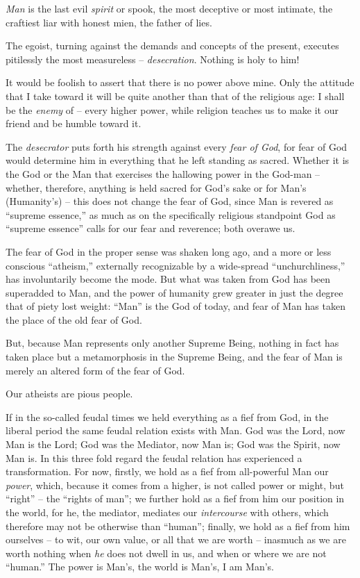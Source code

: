 \textit{Man} is the last evil \textit{spirit} or spook, the most deceptive or 
most intimate, the craftiest liar with honest mien, the father of lies.

The egoist, turning against the demands and concepts of the present, executes 
pitilessly the most measureless -- \textit{desecration}. Nothing is holy to 
him!

It would be foolish to assert that there is no power above mine. Only the 
attitude that I take toward it will be quite another than that of the 
religious age: I shall be the \textit{enemy} of -- every higher power, while 
religion teaches us to make it our friend and be humble toward it.

The \textit{desecrator} puts forth his strength against every \textit{fear of 
God}, for fear of God would determine him in everything that he left standing 
as sacred. Whether it is the God or the Man that exercises the hallowing power 
in the God-man -- whether, therefore, anything is held sacred for God's sake 
or for Man's (Humanity's) -- this does not change the fear of God, since Man 
is revered as ``supreme essence,'' as much as on the specifically religious 
standpoint God as ``supreme essence'' calls for our fear and reverence; both 
overawe us.

The fear of God in the proper sense was shaken long ago, and a more or less 
conscious ``atheism,'' externally recognizable by a wide-spread 
``unchurchliness,'' has involuntarily become the mode. But what was taken 
from God has been superadded to Man, and the power of humanity grew greater in 
just the degree that of piety lost weight: ``Man'' is the God of today, and 
fear of Man has taken the place of the old fear of God.

But, because Man represents only another Supreme Being, nothing in fact has 
taken place but a metamorphosis in the Supreme Being, and the fear of Man is 
merely an altered form of the fear of God.

Our atheists are pious people.

If in the so-called feudal times we held everything as a fief from God, in the 
liberal period the same feudal relation exists with Man. God was the Lord, now 
Man is the Lord; God was the Mediator, now Man is; God was the Spirit, now Man 
is. In this three fold regard the feudal relation has experienced a 
transformation. For now, firstly, we hold as a fief from all-powerful Man our 
\textit{power}, which, because it comes from a higher, is not called power or 
might, but ``right'' -- the ``rights of man''; we further hold as a fief 
from him our position in the world, for he, the mediator, mediates our 
\textit{intercourse} with others, which therefore may not be otherwise than 
``human''; finally, we hold as a fief from him ourselves -- to wit, our own 
value, or all that we are worth -- inasmuch as we are worth nothing when 
\textit{he} does not dwell in us, and when or where we are not ``human.'' 
The power is Man's, the world is Man's, I am Man's.

